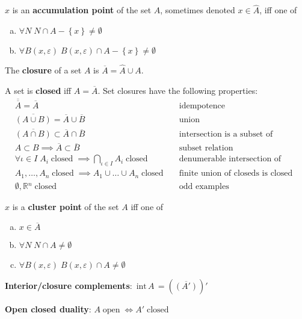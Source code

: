 \documentclass[letterpaper,11pt]{amsart}
\newcommand{\ballo}[2]{B\left( {#1}, {#2} \right)}
\newcommand{\closure}[1]{\overline{#1}}
\newcommand{\interior}[1]{\,\textrm{int}\,{#1}\,}
\newcommand{\reals}{\mathbb{R}}
\newcommand{\keyphrase}[1]{\textbf{#1}}
\DeclareMathOperator{\open}{open}
\DeclareMathOperator{\closed}{closed}
\begin{document}
$x$ is an \keyphrase{accumulation point} of the set $A$,
sometimes denoted $x \in \hat{A}$, iff one of
\begin{enumerate}[(a)]
    \item $\forall N \; N\cap{}A-\left\{ x \right\}\neq\emptyset$
    \item $\forall \ballo{x}{\varepsilon} \;
        \ballo{x}{\varepsilon}\cap{}A-\left\{ x \right\}\neq\emptyset$
\end{enumerate}

The \keyphrase{closure} of a set $A$ is $\closure{A} = \hat{A} \cup A$.

A set is \keyphrase{closed} iff $A = \closure{A}$.
Set closures have the following properties:
\begin{align*}
    &\closure{\left.\closure{A}\right.} = \closure{A}
    & &\text{idempotence} \\
    &\closure{\left( A \cup B \right)} = \closure{A} \cup \closure{B}
    & &\text{union} \\
    &\closure{\left( A \cap B \right)} \subset
        \closure{A} \cap \closure{B}
    & &\text{intersection is a subset of intersections} \\
    &A\subset{}B \implies \closure{A} \subset \closure{B}
    & &\text{subset relation} \\
    &\forall \iota \in I \;
        A_{i} \closed \implies \bigcap\limits_{\iota\in{}I} A_{i} \closed
    & &\text{denumerable intersection of closeds is closed} \\
    &A_{1}, \dots, A_{n} \closed
        \implies A_{1}\cup{}\dots\cup{}A_{n} \closed
    & &\text{finite union of closeds is closed} \\
    &\emptyset, \reals{}^{n} \closed
    & &\text{odd examples} 
\end{align*}

$x$ is a \keyphrase{cluster point} of the set $A$ iff one of
\begin{enumerate}[(a)]
    \item $x \in \closure{A}$
    \item $\forall N \; N\cap{}A\neq\emptyset$
    \item $\forall \ballo{x}{\varepsilon} \;
        \ballo{x}{\varepsilon}\cap{}A\neq\emptyset$
\end{enumerate}

\keyphrase{Interior/closure complements}:
$\interior{A} = \left(\closure{\left(A'\right)}\right)'$

\keyphrase{Open closed duality}: $A \open \iff A' \closed$
\end{document}
